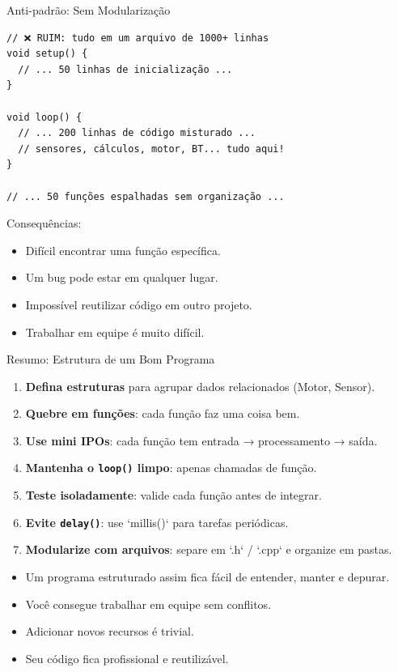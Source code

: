\documentclass[10pt]{beamer}
\begin{document}
\begin{frame}[fragile]{Anti-padrão: Sem Modularização}
\begin{lstlisting}
// ❌ RUIM: tudo em um arquivo de 1000+ linhas
void setup() {
  // ... 50 linhas de inicialização ...
}

void loop() {
  // ... 200 linhas de código misturado ...
  // sensores, cálculos, motor, BT... tudo aqui!
}

// ... 50 funções espalhadas sem organização ...
\end{lstlisting}

  Consequências:
  \begin{itemize}
    \item Difícil encontrar uma função específica.
    \item Um bug pode estar em qualquer lugar.
    \item Impossível reutilizar código em outro projeto.
    \item Trabalhar em equipe é muito difícil.
  \end{itemize}
\end{frame}

\begin{frame}{Resumo: Estrutura de um Bom Programa}
  \begin{enumerate}
    \item \textbf{Defina estruturas} para agrupar dados relacionados (Motor, Sensor).
    \item \textbf{Quebre em funções}: cada função faz uma coisa bem.
    \item \textbf{Use mini IPOs}: cada função tem entrada → processamento → saída.
    \item \textbf{Mantenha o \texttt{loop()} limpo}: apenas chamadas de função.
    \item \textbf{Teste isoladamente}: valide cada função antes de integrar.
    \item \textbf{Evite \texttt{delay()}}: use `millis()` para tarefas periódicas.
    \item \textbf{Modularize com arquivos}: separe em `.h` / `.cpp` e organize em pastas.
  \end{enumerate}
  
  \begin{itemize}
    \item Um programa estruturado assim fica fácil de entender, manter e depurar.
    \item Você consegue trabalhar em equipe sem conflitos.
    \item Adicionar novos recursos é trivial.
    \item Seu código fica profissional e reutilizável.
  \end{itemize}
\end{frame}
\end{document}
